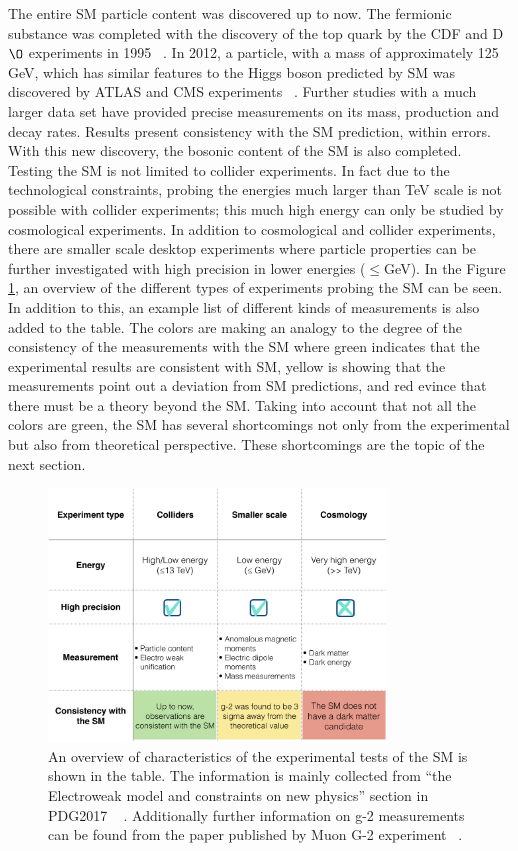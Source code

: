 The entire SM particle content was discovered up to now. The fermionic substance was completed with the discovery of the top quark by the CDF and D$\O$ experiments in 1995 ~\cite{top1,top2}. In 2012, a particle, with a mass of approximately 125 GeV, which has similar features to the Higgs boson predicted by SM was discovered by ATLAS and CMS experiments ~\cite{higgsexp1,higgsexp2}.  Further studies with a much larger data set have provided precise measurements on its mass, production and decay rates. Results present consistency with the SM prediction, within errors. 
 With this new discovery, the bosonic content of the SM is also completed.\\
Testing the SM is not limited to collider experiments. In fact due to the technological constraints, probing the energies much larger than TeV scale is not possible with collider experiments; this much high energy can only be studied by cosmological experiments. In addition to cosmological and collider experiments, there are smaller scale desktop experiments where particle properties can be further investigated with high precision in lower energies ($\leq$GeV).
In the Figure \ref{tab:SM_tests}, an overview of the different types of experiments probing the SM can be seen. In addition to this, an example list of different kinds of measurements is also added to the table. The colors are making an analogy to the degree of the consistency of the measurements with the SM where green indicates that the experimental results are consistent with SM, yellow is showing that the measurements point out a deviation from SM predictions, and red evince that there must be a theory beyond the SM. Taking into account that not all the colors are green, the SM has several shortcomings not only from the experimental but also from theoretical perspective.  These shortcomings are the topic of the next section.
\begin{figure}[!hb]
\centering
  \includegraphics[width=0.8\textwidth]{Plots/SM/experiments.pdf}
  \caption{ An overview of characteristics of the experimental tests of the SM is shown in the table. 
  The information is mainly collected from ``the Electroweak model and constraints on new physics'' section in PDG2017 ~\cite{Olive:2016xmw} . Additionally further information on g-2 measurements can be found from the paper published by Muon G-2 experiment ~\cite{g2}.}
  \label{tab:SM_tests}
\end{figure}
